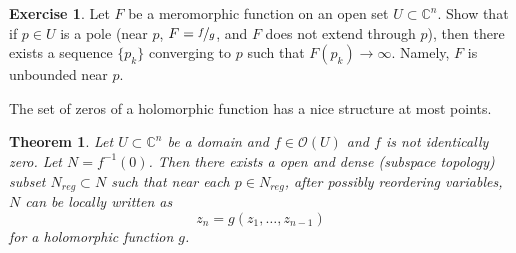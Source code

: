 \documentclass[12pt,openany]{book}
\newcommand{\C}{{\mathbb{C}}}
\newcommand{\sO}{{\mathscr{O}}}
\theoremstyle{plain}
\newtheorem{thm}{Theorem}[section]
\theoremstyle{remark}
\theoremstyle{definition}
\newenvironment{exbox}{%
    \def\FrameCommand{\vrule width 1pt \relax\hspace{10pt}}%
    \MakeFramed{\advance\hsize-\width\FrameRestore}%
}{%
    \endMakeFramed
}
\theoremstyle{exercise}
\newtheorem{exercise}{Exercise}[section]
\theoremstyle{example}
\begin{document}
\begin{exbox}
\begin{exercise}
Let $F$ be a meromorphic function on an open set $U \subset \C^n$.  Show
that if $p \in U$ is a pole (near $p$, $F=\nicefrac{f}{g}$, and $F$ does not
extend through $p$), then there exists a sequence $\{ p_k \}$
converging to $p$ such that $F(p_k) \to \infty$.  Namely, $F$ is
unbounded near $p$.
\end{exercise}
\end{exbox}

The set of zeros of a holomorphic function has a nice structure at most
points.

\begin{thm} \label{thm:regptsdense}
Let $U \subset \C^n$ be a domain and
$f \in \sO(U)$ and $f$ is not identically zero.
Let $N = f^{-1}(0)$.  Then there exists a open and dense (subspace topology) subset
$N_{\mathit{reg}} \subset N$
such that near each $p \in N_{\mathit{reg}}$, after possibly reordering variables,
$N$ can be locally written as
\begin{equation*}
z_n = g(z_1,\ldots,z_{n-1})
\end{equation*}
for a holomorphic function $g$.
\end{thm}
\end{document}

